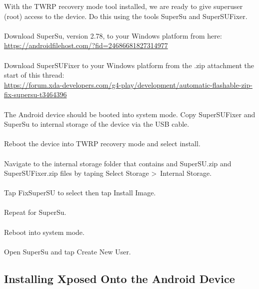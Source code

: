 With the TWRP recovery mode tool installed, we are ready to give superuser (root) access to the device.  Do this using the tools SuperSu and SuperSUFixer.\\
\\
Download SuperSu, version 2.78, to your Windows platform from here:\\
\url{https://androidfilehost.com/?fid=24686681827314977}\\
\\
Download SuperSUFixer to your Windows platform from the .zip attachment the start of this thread:\\
\url{https://forum.xda-developers.com/g4-play/development/automatic-flashable-zip-fix-supersu-t3464396}\\
\\
The Android device should be booted into system mode.  Copy SuperSUFixer and SuperSu to internal storage of the device via the USB cable.\\
\\
Reboot the device into TWRP recovery mode and select install.\\
\\
Navigate to the internal storage folder that contains and SuperSU.zip and SuperSUFixer.zip files by taping Select Storage \textgreater\ Internal Storage.\\
\\
Tap FixSuperSU to select then tap Install Image.\\
\\
Repeat for SuperSu.\\
\\
Reboot into system mode.\\
\\
Open SuperSu and tap Create New User.

\subsection{Installing Xposed Onto the Android Device}
\label{sec:Installing Xposed onto the Android Device}

